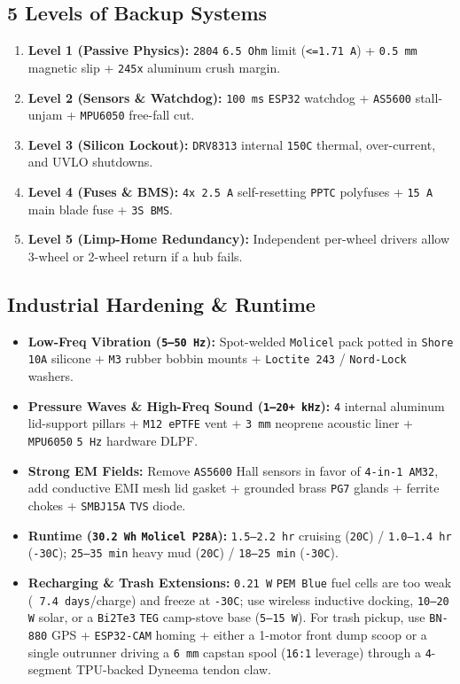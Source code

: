 \documentclass[11pt,a4paper]{article}
\begin{document}
\subsection{5 Levels of Backup Systems}
\begin{enumerate}
  \item \textbf{Level 1 (Passive Physics):} \texttt{2804} \texttt{6.5 Ohm} limit (\texttt{<=1.71 A}) + \texttt{0.5 mm} magnetic slip + \texttt{245x} aluminum crush margin.
  \item \textbf{Level 2 (Sensors \& Watchdog):} \texttt{100 ms} \texttt{ESP32} watchdog + \texttt{AS5600} stall-unjam + \texttt{MPU6050} free-fall cut.
  \item \textbf{Level 3 (Silicon Lockout):} \texttt{DRV8313} internal \texttt{150C} thermal, over-current, and UVLO shutdowns.
  \item \textbf{Level 4 (Fuses \& BMS):} \texttt{4x 2.5 A} self-resetting \texttt{PPTC} polyfuses + \texttt{15 A} main blade fuse + \texttt{3S BMS}.
  \item \textbf{Level 5 (Limp-Home Redundancy):} Independent per-wheel drivers allow 3-wheel or 2-wheel return if a hub fails.
\end{enumerate}

\subsection{Industrial Hardening \& Runtime}
\begin{itemize}
  \item \textbf{Low-Freq Vibration (\texttt{5–50 Hz}):} Spot-welded \texttt{Molicel} pack potted in \texttt{Shore 10A} silicone + \texttt{M3} rubber bobbin mounts + \texttt{Loctite 243} / \texttt{Nord-Lock} washers.
  \item \textbf{Pressure Waves \& High-Freq Sound (\texttt{1–20+ kHz}):} \texttt{4} internal aluminum lid-support pillars + \texttt{M12 ePTFE} vent + \texttt{3 mm} neoprene acoustic liner + \texttt{MPU6050} \texttt{5 Hz} hardware DLPF.
  \item \textbf{Strong EM Fields:} Remove \texttt{AS5600} Hall sensors in favor of \texttt{4-in-1 AM32}, add conductive EMI mesh lid gasket + grounded brass \texttt{PG7} glands + ferrite chokes + \texttt{SMBJ15A} \texttt{TVS} diode.
  \item \textbf{Runtime (\texttt{30.2 Wh} \texttt{Molicel P28A}):} \texttt{1.5–2.2 hr} cruising (\texttt{20C}) / \texttt{1.0–1.4 hr} (\texttt{-30C}); \texttt{25–35 min} heavy mud (\texttt{20C}) / \texttt{18–25 min} (\texttt{-30C}).
  \item \textbf{Recharging \& Trash Extensions:} \texttt{0.21 W} \texttt{PEM Blue} fuel cells are too weak (\texttt{~7.4 days}/charge) and freeze at \texttt{-30C}; use wireless inductive docking, \texttt{10–20 W} solar, or a \texttt{Bi2Te3} \texttt{TEG} camp-stove base (\texttt{5–15 W}). For trash pickup, use \texttt{BN-880} GPS + \texttt{ESP32-CAM} homing + either a 1-motor front dump scoop or a single outrunner driving a \texttt{6 mm} capstan spool (\texttt{16:1} leverage) through a \texttt{4}-segment TPU-backed Dyneema tendon claw.
\end{itemize}
\end{document}
